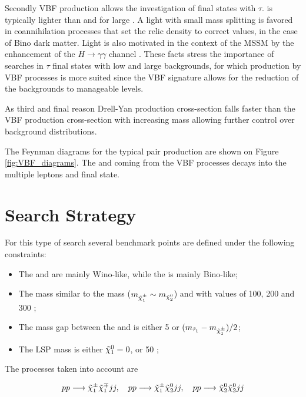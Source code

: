 Secondly VBF production allows the investigation of final states with $\tau$. \stau is typically lighter than \smuon and \selectron for large \tanbeta \cite{Hinchliffe:1999zc}. A light \stau with small mass splitting is favored in coannihilation processes \cite{Griest:1990kh} that set the relic density to correct values, in the case of Bino dark matter. Light \stau is also motivated in the context of the MSSM by the enhancement of the $H \longrightarrow \gamma\gamma$ channel \cite{Carena:2011aa}. These facts stress the importance of searches in $\tau$ final states with low \pt and large backgrounds, for which production by VBF processes is more suited since the VBF signature allows for the reduction of the backgrounds to manageable levels.

As third and final reason Drell-Yan production cross-section falls faster than the VBF production cross-section with increasing mass \cite{Datta:2002vy} allowing further control over background distributions.

The Feynman diagrams for the typical \charginopm \neutralinotwo pair production are shown on  Figure \ref{fig:VBF_diagrams}. The \charginopm and \neutralinotwo coming from the VBF processes decays into the multiple leptons and \neutralinoone final state.

\section {Search Strategy}
\label{section::search_strategy}

For this type of search several benchmark points are defined under the following constraints:
\begin{itemize}
	\item The \charginopm and \neutralinotwo are mainly Wino-like, while the \neutralinoone is mainly Bino-like;
	\item The \charginomp mass similar to the \neutralinotwo mass ($m_{\tilde{\chi}^{\pm}_{1}} \sim m_{\tilde{\chi}^{0}_{2}}$) and with values of 100, 200 and 300 \gev;
	\item The mass gap between the \stau and \charginopm is either 5 \gev or $(m_{\tilde{\tau}_{1}} - m_{\tilde{\chi}^{\pm}_{1}})/2$;
	\item The LSP mass is either $\tilde{\chi}^{0}_{1} = 0$, or 50 \gev;
\end{itemize}

The processes taken into account are

\begin{equation}
pp \longrightarrow \tilde{\chi}^{\pm}_{1} \tilde{\chi}^{\mp}_{1} jj, \quad pp \longrightarrow \tilde{\chi}^{\pm}_{1} \tilde{\chi}^{0}_{2} jj, \quad pp \longrightarrow \tilde{\chi}^{0}_{2} \tilde{\chi}^{0}_{2} jj
\end{equation}


